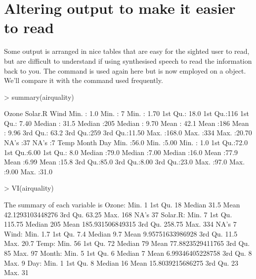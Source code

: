  
 
\section{Altering \R{} output to make it easier to read} 
 
Some \R{} output is arranged in nice tables that are easy for the sighted user to read, but are difficult to understand if using synthesised  speech to read the information back to you. The  command is used again here but is now employed on a  object. We'll compare it with the  command used frequently. 

\begin{Schunk}
\begin{Sinput}
> summary(airquality) 
\end{Sinput}
\begin{Soutput}
     Ozone          Solar.R         Wind      
 Min.   :  1.0   Min.   :  7   Min.   : 1.70  
 1st Qu.: 18.0   1st Qu.:116   1st Qu.: 7.40  
 Median : 31.5   Median :205   Median : 9.70  
 Mean   : 42.1   Mean   :186   Mean   : 9.96  
 3rd Qu.: 63.2   3rd Qu.:259   3rd Qu.:11.50  
 Max.   :168.0   Max.   :334   Max.   :20.70  
 NA's   :37      NA's   :7                    
      Temp          Month           Day      
 Min.   :56.0   Min.   :5.00   Min.   : 1.0  
 1st Qu.:72.0   1st Qu.:6.00   1st Qu.: 8.0  
 Median :79.0   Median :7.00   Median :16.0  
 Mean   :77.9   Mean   :6.99   Mean   :15.8  
 3rd Qu.:85.0   3rd Qu.:8.00   3rd Qu.:23.0  
 Max.   :97.0   Max.   :9.00   Max.   :31.0  
                                             
\end{Soutput}
\begin{Sinput}
> VI(airquality) 
\end{Sinput}
\begin{Soutput}

The summary of each variable is
Ozone: Min. 1   1st Qu. 18   Median 31.5   Mean 42.1293103448276   3rd Qu. 63.25   Max. 168   NA's 37  
Solar.R: Min. 7   1st Qu. 115.75   Median 205   Mean 185.931506849315   3rd Qu. 258.75   Max. 334   NA's 7  
Wind: Min. 1.7   1st Qu. 7.4   Median 9.7   Mean 9.95751633986928   3rd Qu. 11.5   Max. 20.7  
Temp: Min. 56   1st Qu. 72   Median 79   Mean 77.8823529411765   3rd Qu. 85   Max. 97  
Month: Min. 5   1st Qu. 6   Median 7   Mean 6.99346405228758   3rd Qu. 8   Max. 9  
Day: Min. 1   1st Qu. 8   Median 16   Mean 15.8039215686275   3rd Qu. 23   Max. 31  
\end{Soutput}
\end{Schunk}

